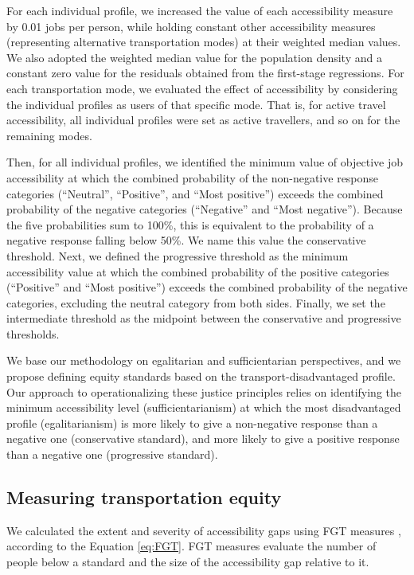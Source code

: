 \documentclass[preprint, 3p,
authoryear]{elsarticle} %
\begin{document}
For each individual profile, we increased the value of each
accessibility measure by 0.01 jobs per person, while holding constant
other accessibility measures (representing alternative transportation
modes) at their weighted median values. We also adopted the weighted
median value for the population density and a constant zero value for
the residuals obtained from the first-stage regressions. For each
transportation mode, we evaluated the effect of accessibility by
considering the individual profiles as users of that specific mode. That
is, for active travel accessibility, all individual profiles were set as
active travellers, and so on for the remaining modes.

Then, for all individual profiles, we identified the minimum value of
objective job accessibility at which the combined probability of the
non-negative response categories (``Neutral'', ``Positive'', and ``Most
positive'') exceeds the combined probability of the negative categories
(``Negative'' and ``Most negative''). Because the five probabilities sum
to 100\%, this is equivalent to the probability of a negative response
falling below 50\%. We name this value the conservative threshold. Next,
we defined the progressive threshold as the minimum accessibility value
at which the combined probability of the positive categories
(``Positive'' and ``Most positive'') exceeds the combined probability of
the negative categories, excluding the neutral category from both sides.
Finally, we set the intermediate threshold as the midpoint between the
conservative and progressive thresholds.

We base our methodology on egalitarian and sufficientarian perspectives,
and we propose defining equity standards based on the
transport-disadvantaged profile. Our approach to operationalizing these
justice principles relies on identifying the minimum accessibility level
(sufficientarianism) at which the most disadvantaged profile
(egalitarianism) is more likely to give a non-negative response than a
negative one (conservative standard), and more likely to give a positive
response than a negative one (progressive standard).

\subsection{Measuring transportation
equity}\label{measuring-transportation-equity}

We calculated the extent and severity of accessibility gaps using FGT
measures \citep{foster2010}, according to the Equation \ref{eq:FGT}. FGT
measures evaluate the number of people below a standard and the size of
the accessibility gap relative to it.
\end{document}
